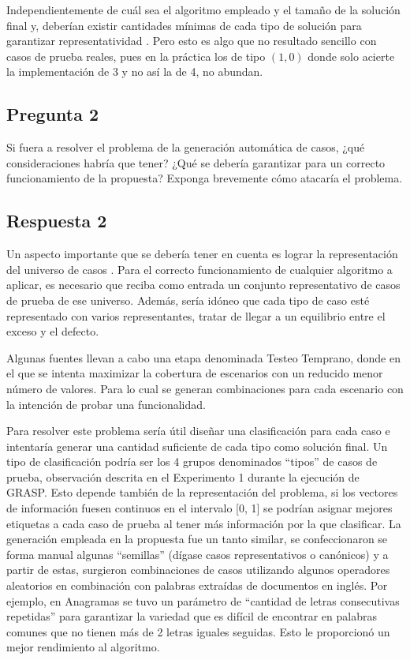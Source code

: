 \documentclass[a4paper,11pt]{article}
\begin{document}
		Independientemente de cuál sea el algoritmo empleado y el tamaño de la solución final y, deberían existir cantidades mínimas de cada tipo de solución para garantizar representatividad \cite{cicerchia2017problemas}. Pero esto es algo que no resultado sencillo con casos de prueba reales, pues en la práctica los de tipo $(1,0)$ donde solo acierte la implementación de 3 y no así la de 4, no abundan.
		
		\subsection*{Pregunta 2}
		Si fuera a resolver el problema de la generación automática de casos, ¿qué consideraciones habría que tener? ¿Qué se debería garantizar para un correcto funcionamiento de la propuesta? Exponga brevemente cómo atacaría el problema.
		
		\subsection*{Respuesta 2}
		Un aspecto importante que se debería tener en cuenta es lograr la representación del universo de casos \cite{rodriguez2016generacion}. Para el correcto funcionamiento de cualquier algoritmo a aplicar, es necesario que reciba como entrada un conjunto representativo de casos de prueba de ese universo. Además, sería idóneo que cada tipo de caso esté representado con varios representantes, tratar de llegar a un equilibrio entre el exceso y el defecto.
		
		Algunas fuentes \cite{macias2016generador} llevan a cabo una etapa denominada Testeo Temprano, donde en el que se intenta maximizar la cobertura de escenarios con un reducido menor número de valores. Para lo cual se generan combinaciones para cada escenario con la intención de probar una funcionalidad. 
		
		Para resolver este problema sería útil diseñar una clasificación para cada caso e intentaría generar una cantidad suficiente de cada tipo como solución final. Un tipo de clasificación podría ser los 4 grupos denominados “tipos” de casos de prueba, observación descrita en el Experimento 1 durante la ejecución de GRASP. Esto depende también de la representación del problema, si los vectores de información fuesen continuos en el intervalo [0, 1] se podrían asignar mejores etiquetas a cada caso de prueba al tener más información por la que clasificar.
		La generación empleada en la propuesta fue un tanto similar, se confeccionaron se forma manual algunas “semillas” (dígase casos representativos o canónicos) y a partir de estas, surgieron combinaciones de casos utilizando algunos operadores aleatorios en combinación con palabras extraídas de documentos en inglés. Por ejemplo, en Anagramas se tuvo un parámetro de “cantidad de letras consecutivas repetidas” para garantizar la variedad que es difícil de encontrar en palabras comunes que no tienen más de 2 letras iguales seguidas. Esto le proporcionó un mejor rendimiento al algoritmo.
		
\end{document}
